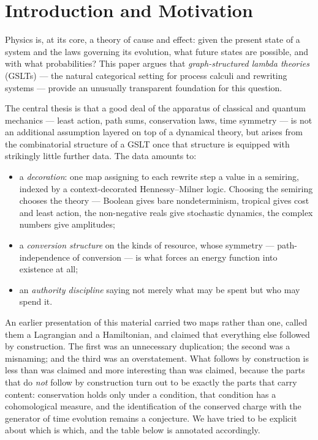 \chapter{Introduction and Motivation}

Physics is, at its core, a theory of cause and effect: given the present state
of a system and the laws governing its evolution, what future states are
possible, and with what probabilities?  This paper argues that
\emph{graph-structured lambda theories} (GSLTs) --- the natural categorical
setting for process calculi and rewriting systems --- provide an unusually
transparent foundation for this question.

The central thesis is that a good deal of the apparatus of classical and
quantum mechanics --- least action, path sums, conservation laws, time
symmetry --- is not an additional assumption layered on top of a dynamical
theory, but arises from the combinatorial structure of a GSLT once that
structure is equipped with strikingly little further data.  The data
amounts to:

\begin{itemize}[itemsep=2pt]
  \item a \emph{decoration}: one map assigning to each rewrite step a value
        in a semiring, indexed by a context-decorated Hennessy--Milner
        logic.  Choosing the semiring chooses the theory --- Boolean gives
        bare nondeterminism, tropical gives cost and least action,
        the non-negative reals give stochastic dynamics, the complex
        numbers give amplitudes;
  \item a \emph{conversion structure} on the kinds of resource, whose
        symmetry --- path-independence of conversion --- is what forces an
        energy function into existence at all;
  \item an \emph{authority discipline} saying not merely what may be spent
        but who may spend it.
\end{itemize}

An earlier presentation of this material carried two maps rather than one,
called them a Lagrangian and a Hamiltonian, and claimed that everything
else followed by construction.  The first was an unnecessary duplication;
the second was a misnaming; and the third was an overstatement.  What
follows by construction is less than was claimed and more interesting than
was claimed, because the parts that do \emph{not} follow by construction
turn out to be exactly the parts that carry content: conservation holds
only under a condition, that condition has a cohomological measure, and
the identification of the conserved charge with the generator of time
evolution remains a conjecture.  We have tried to be explicit about which
is which, and the table below is annotated accordingly.

